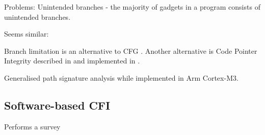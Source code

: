 Problems: Unintended branches \cite{Kayaalp2014} - the majority of gadgets in a program consists of unintended branches. 

Seems similar: \cite{Mao2010}

Branch limitation is an alternative to CFG \cite{He2017} \cite{Corporation2017}.
Another alternative is Code Pointer Integrity described in \cite{Security2017} and implemented in \cite{Kuznetsov:204783} \cite{Mashtizadeh2014} \cite{Szekeres2013}.

Generalised path signature analysis \cite{Mahmood1988} while \cite{Werner2016} implemented in Arm Cortex-M3.

\subsection{Software-based CFI}
\cite{Burow} Performs a survey